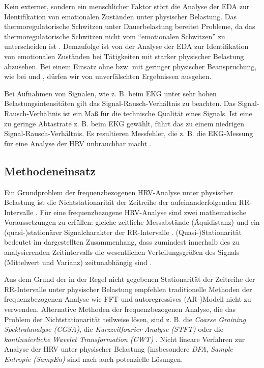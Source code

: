 Kein externer, sondern ein menschlicher Faktor stört die Analyse der \ac{EDA} zur Identifikation von emotionalen Zuständen unter physischer Belastung. Das thermoregulatorische Schwitzen unter Dauerbelastung bereitet Probleme, da das thermoregulatorische Schwitzen nicht vom "`emotionalen Schwitzen"' zu unterscheiden ist \citep[vgl.][]{Baumeister2008}. Demzufolge ist von der Analyse der \ac{EDA} zur Identifikation von emotionalen Zuständen bei Tätigkeiten mit starker physischer Belastung abzusehen. Bei einem Einsatz ohne bzw. mit geringer physischer Beanspruchung, wie bei \citet{Kivikangas2006} und \citet{Nacke2008}, dürfen wir von unverfälschten Ergebnissen ausgehen.

Bei Aufnahmen von Signalen, wie z. B. beim \ac{EKG} unter sehr hohen Belastungsintensitäten gilt das Signal-Rausch-Verhältnis zu beachten. Das Signal-Rausch-Verhältnis ist ein Maß für die technische Qualität eines Signals. Ist eine zu geringe Abtastrate z. B. beim \ac{EKG} gewählt, führt das zu einem niedrigen Signal-Rausch-Verhältnis. Es resultieren Messfehler, die z. B. die \ac{EKG}-Messung für eine Analyse der \ac{HRV} unbrauchbar macht \citep[vgl.][]{Hoos2010}.

\subsection{Methodeneinsatz}
Ein Grundproblem der frequenzbezogenen \ac{HRV}-Analyse unter physischer Belastung ist die Nichtstationarität der Zeitreihe der aufeinanderfolgenden RR-Intervalle \citep[vgl.][]{Hottenrott2006}. Für eine frequenzbezogene \ac{HRV}-Analyse sind zwei mathematische Voraussetzungen zu erfüllen: gleiche zeitliche Messabstände (Äquidistanz) und ein (quasi-)stationärer Signalcharakter der RR-Intervalle \citep[vgl.][]{Hoos2006}. (Quasi-)Stationarität bedeutet im dargestellten Zusammenhang, dass zumindest innerhalb des zu analysierenden Zeitintervalls die wesentlichen Verteilungsgrößen des Signals (Mittelwert und Varianz) zeitunabhängig sind \citep[vgl.][]{Hoos2006}.

Aus dem Grund der in der Regel nicht gegebenen Stationarität der Zeitreihe der RR-Intervalle unter physischer Belastung empfehlen \citet[S.~113]{Sarmiento2013} traditionelle Methoden der frequenzbezogenen Analyse wie \acs{FFT} und autoregressives (AR-)Modell nicht zu verwenden. Alternative Methoden der frequenzbezogenen Analyse, die das Problem der Nichtstationarität teilweise lösen, sind z. B. die \emph{Coarse Graining Spektralanalyse (CGSA)}, die \emph{Kurzzeitfourier-Analyse (STFT)} oder die \emph{kontinuierliche Wavelet Transformation (CWT)} \citep[vgl.][S.~61f.]{Hoos2010}. Nicht lineare Verfahren zur Analyse der \ac{HRV} unter physischer Belastung (insbesondere \emph{\ac{DFA}}, \emph{Sample Entropie (SampEn)} sind nach \citet[vgl.][S.~61f.]{Hoos2010} auch potenzielle Lösungen.

